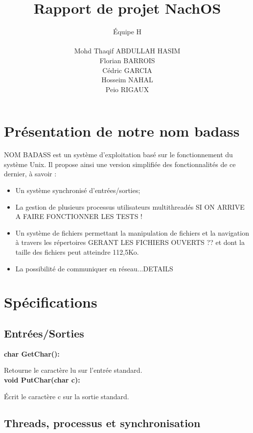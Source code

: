 \documentclass[12pt]{report}
\title{Rapport de projet NachOS}
\author{
\'Equipe H\\\\
Mohd Thaqif ABDULLAH HASIM\\
Florian BARROIS\\
Cédric GARCIA\\
Hosseim NAHAL\\
Peio RIGAUX\\
}
\begin{document}
\maketitle


\chapter{Présentation de \color{red}notre nom badass\color{black}}

\color{red}NOM BADASS\color{black} est un système d'exploitation basé sur le fonctionnement du système Unix. Il propose ainsi une version simplifiée des fonctionnalités de ce dernier, à savoir :
\begin{itemize}\renewcommand{\labelitemi}{$\bullet$}
\item Un système synchronisé d'entrées/sorties;
\item La gestion de plusieurs processus utilisateurs multithreadés \color{red}SI ON ARRIVE A FAIRE FONCTIONNER LES TESTS !\color{black}
\item Un système de fichiers permettant la manipulation de fichiers et la navigation à travers les répertoires \color{red}GERANT LES FICHIERS OUVERTS ??\color{black} et dont la taille des fichiers peut atteindre 112,5Ko.
\item La possibilité de communiquer en réseau...\color{red}DETAILS\color{black}

\end{itemize}


\chapter{Spécifications}
\section{Entrées/Sorties}

\textbf{char GetChar():}

Retourne le caractère lu sur l'entrée standard.\\


\textbf{void PutChar(char c):}

Écrit le caractère c sur la sortie standard.\\


\bigskip

\section{Threads, processus et synchronisation}
\bigskip
\end{document}
